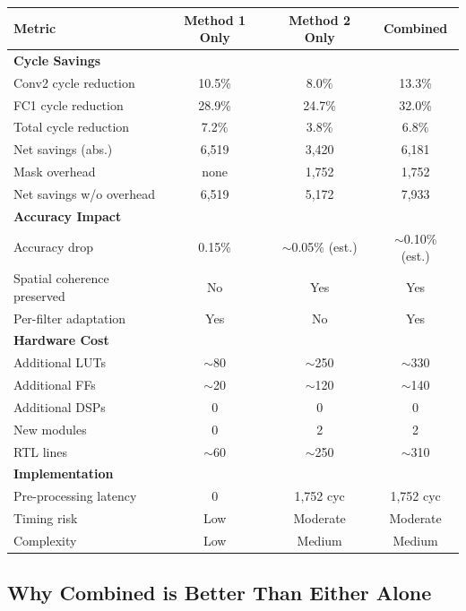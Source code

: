 \documentclass[11pt,a4paper]{article}
\begin{document}
\begin{center}
\begin{tabular}{lccc}
\toprule
\textbf{Metric} & \textbf{Method 1 Only} & \textbf{Method 2 Only} & \textbf{Combined} \\
\midrule
\multicolumn{4}{l}{\textbf{Cycle Savings}} \\
  Conv2 cycle reduction   & 10.5\% & 8.0\% & 13.3\% \\
  FC1 cycle reduction     & 28.9\% & 24.7\% & 32.0\% \\
  Total cycle reduction   & 7.2\% & 3.8\% & 6.8\% \\
  Net savings (abs.)      & 6,519 & 3,420 & 6,181 \\
  Mask overhead           & none & 1,752 & 1,752 \\
  Net savings w/o overhead & 6,519 & 5,172 & 7,933 \\
\midrule
\multicolumn{4}{l}{\textbf{Accuracy Impact}} \\
  Accuracy drop    & 0.15\% & $\sim$0.05\% (est.) & $\sim$0.10\% (est.) \\
  Spatial coherence preserved & No & \textcolor{activegreen}{Yes} & \textcolor{activegreen}{Yes} \\
  Per-filter adaptation  & \textcolor{activegreen}{Yes} & No & \textcolor{activegreen}{Yes} \\
\midrule
\multicolumn{4}{l}{\textbf{Hardware Cost}} \\
  Additional LUTs     & $\sim$80 & $\sim$250 & $\sim$330 \\
  Additional FFs      & $\sim$20 & $\sim$120 & $\sim$140 \\
  Additional DSPs     & 0 & 0 & 0 \\
  New modules          & 0 & 2 & 2 \\
  RTL lines            & $\sim$60 & $\sim$250 & $\sim$310 \\
\midrule
\multicolumn{4}{l}{\textbf{Implementation}} \\
  Pre-processing latency & 0 & 1,752 cyc & 1,752 cyc \\
  Timing risk            & Low & Moderate & Moderate \\
  Complexity             & \textcolor{activegreen}{Low} & Medium & Medium \\
\bottomrule
\end{tabular}
\end{center}

\subsection{Why Combined is Better Than Either Alone}
\end{document}
